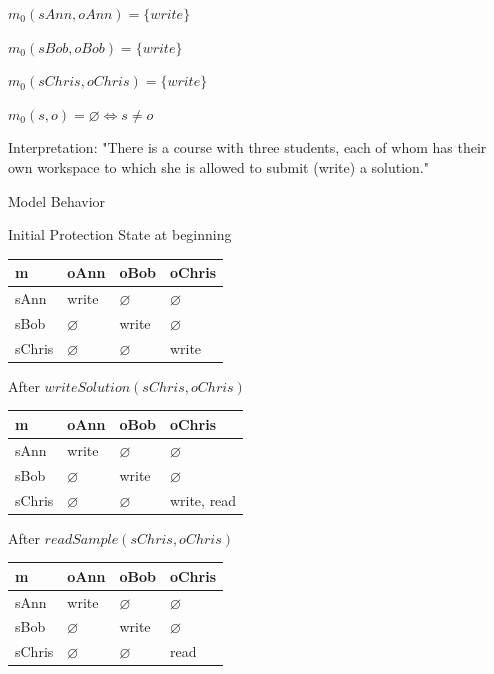 \documentclass[a4paper]{article}
\begin{document}
\begin{multicols}{3}
\begin{itemize*}
\begin{itemize*}
\begin{itemize*}
                \item $m_0(sAnn,oAnn)=\{write\}$
                \item $m_0(sBob,oBob)=\{write\}$
                \item $m_0(sChris,oChris)=\{write\}$
                \item $m_0(s,o)=\varnothing \Leftrightarrow s\not= o$
            \end{itemize*}
            \item Interpretation: "There is a course with three students, each of whom has their own workspace to which she is allowed to submit (write) a solution."
        \end{itemize*}
    \end{itemize*}

    Model Behavior
    \begin{itemize*}
        \item Initial Protection State at beginning
        \begin{center}\begin{tabular}{l|l|l|l}
                m      & oAnn          & oBob          & oChris        \\\hline
                sAnn   & {write}       & $\varnothing$ & $\varnothing$ \\
                sBob   & $\varnothing$ & {write}       & $\varnothing$ \\
                sChris & $\varnothing$ & $\varnothing$ & {write}
            \end{tabular}\end{center}
        \item After $writeSolution(sChris, oChris)$
        \begin{center}\begin{tabular}{l|l|l|l}
                m      & oAnn          & oBob          & oChris        \\\hline
                sAnn   & {write}       & $\varnothing$ & $\varnothing$ \\
                sBob   & $\varnothing$ & {write}       & $\varnothing$ \\
                sChris & $\varnothing$ & $\varnothing$ & {write, read}
            \end{tabular}\end{center}
        \item After $readSample(sChris, oChris)$
        \begin{center}\begin{tabular}{l|l|l|l}
                m      & oAnn          & oBob          & oChris        \\\hline
                sAnn   & {write}       & $\varnothing$ & $\varnothing$ \\
                sBob   & $\varnothing$ & {write}       & $\varnothing$ \\
                sChris & $\varnothing$ & $\varnothing$ & {read}
            \end{tabular}\end{center}
    \end{itemize*}


\end{multicols}
\end{document}
